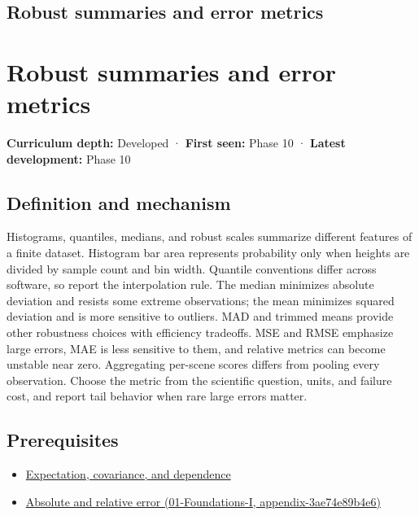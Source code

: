 \hypertarget{appendix-bcc44e9d3d02}{}
\section*{Robust summaries and error metrics}
\chapter{Robust summaries and error metrics}\label{appendix-bcc44e9d3d02-robust-summaries-and-error-metrics}

\textbf{Curriculum depth:} Developed · \textbf{First seen:} Phase 10 · \textbf{Latest development:} Phase 10

\section{Definition and mechanism}\label{appendix-bcc44e9d3d02-definition-and-mechanism}

Histograms, quantiles, medians, and robust scales summarize different features of a finite dataset. Histogram bar area represents probability only when heights are divided by sample count and bin width. Quantile conventions differ across software, so report the interpolation rule. The median minimizes absolute deviation and resists some extreme observations; the mean minimizes squared deviation and is more sensitive to outliers. MAD and trimmed means provide other robustness choices with efficiency tradeoffs. MSE and RMSE emphasize large errors, MAE is less sensitive to them, and relative metrics can become unstable near zero. Aggregating per-scene scores differs from pooling every observation. Choose the metric from the scientific question, units, and failure cost, and report tail behavior when rare large errors matter.

\section{Prerequisites}\label{appendix-bcc44e9d3d02-prerequisites}

\begin{itemize}
\tightlist
\item
  \hyperref[appendix-54c383df9992]{Expectation, covariance, and dependence}
\item
  \href{../01-Foundations-I/main.pdf\#nameddest=appendix-3ae74e89b4e6}{Absolute and relative error (01-Foundations-I, appendix-3ae74e89b4e6)}
\end{itemize}

